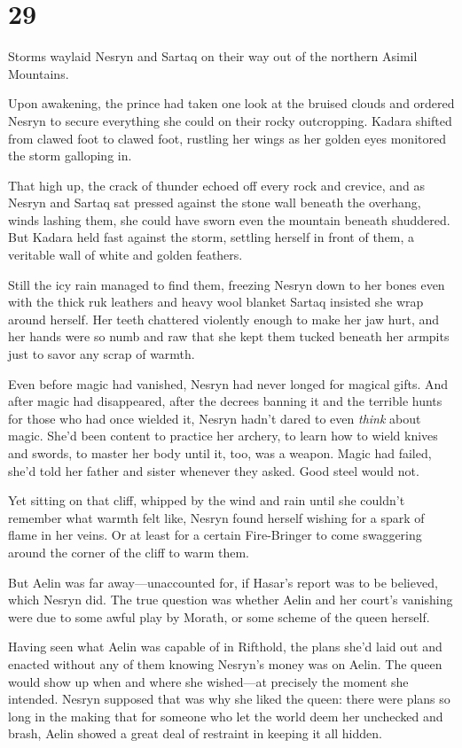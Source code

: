 
\chapter{29}

Storms waylaid Nesryn and Sartaq on their way out of the northern Asimil Mountains.

Upon awakening, the prince had taken one look at the bruised clouds and ordered Nesryn to secure everything she could on their rocky outcropping. Kadara shifted from clawed foot to clawed foot, rustling her wings as her golden eyes monitored the storm galloping in.

That high up, the crack of thunder echoed off every rock and crevice, and as Nesryn and Sartaq sat pressed against the stone wall beneath the overhang, winds lashing them, she could have sworn even the mountain beneath shuddered. But Kadara held fast against the storm, settling herself in front of them, a veritable wall of white and golden feathers.

Still the icy rain managed to find them, freezing Nesryn down to her bones even with the thick ruk leathers and heavy wool blanket Sartaq insisted she wrap around herself. Her teeth chattered violently enough to make her jaw hurt, and her hands were so numb and raw that she kept them tucked beneath her armpits just to savor any scrap of warmth.

Even before magic had vanished, Nesryn had never longed for magical gifts. And after magic had disappeared, after the decrees banning it and the terrible hunts for those who had once wielded it, Nesryn hadn't dared to even \emph{think} about magic. She'd been content to practice her archery, to learn how to wield knives and swords, to master her body until it, too, was a weapon. Magic had failed, she'd told her father and sister whenever they asked. Good steel would not.

Yet sitting on that cliff, whipped by the wind and rain until she couldn't remember what warmth felt like, Nesryn found herself wishing for a spark of flame in her veins. Or at least for a certain Fire-Bringer to come swaggering around the corner of the cliff to warm them.

But Aelin was far away---unaccounted for, if Hasar's report was to be believed, which Nesryn did. The true question was whether Aelin and her court's vanishing were due to some awful play by Morath, or some scheme of the queen herself.

Having seen what Aelin was capable of in Rifthold, the plans she'd laid out and enacted without any of them knowing  Nesryn's money was on Aelin. The queen would show up when and where she wished---at precisely the moment she intended. Nesryn supposed that was why she liked the queen: there were plans so long in the making that for someone who let the world deem her unchecked and brash, Aelin showed a great deal of restraint in keeping it all hidden.

